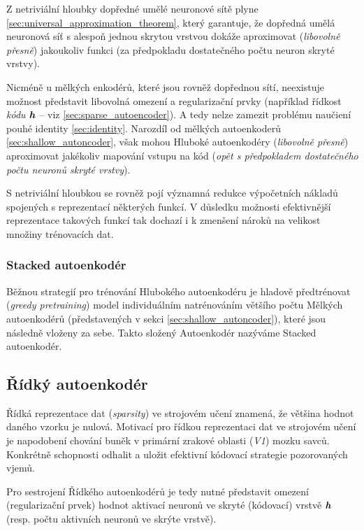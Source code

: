 Z netriviální hloubky dopředné umělé neuronové sítě plyne \autoref{sec:universal_approximation_theorem},
který garantuje, že dopředná umělá neuronová síť s alespoň jednou skrytou vrstvou dokáže aproximovat (\emph{libovolně přesně}) jakoukoliv funkci (za předpokladu dostatečného počtu neuron skryté vrstvy).

Nicméně u mělkých enkodérů, které jsou rovněž dopřednou sítí, neexistuje možnost představit libovolná omezení a regularizační prvky (například řídkost \emph{kódu} $\textbf{\emph{h}}$ – viz \autoref{sec:sparse_autoencoder}).
A tedy nelze zamezit problému naučiení pouhé identity \autoref{sec:identity}. Narozdíl od mělkých autoenkoderů \autoref{sec:shallow_autoncoder},
však mohou Hluboké autoenkodéry (\emph{libovolně přesně}) aproximovat jakékoliv mapování vstupu na kód (\emph{opět s předpokladem dostatečného počtu neuronů skryté vrstvy}).

S netriviální hloubkou se rovněž pojí významná redukce výpočetních nákladů spojených s reprezentací některých funkcí. 
V důsledku možnosti efektivnější reprezentace takových funkcí tak dochazí i k zmenšení nároků na velikost množiny trénovacích dat.


\subsubsection{Stacked autoenkodér}
Běžnou strategií pro trénování Hlubokého autoenkodéru je hladově předtrénovat (\emph{greedy pretraining}) model individuálním natrénováním většího počtu Mělkých autoenkodérů (představených v sekci \autoref{sec:shallow_autoncoder}), které jsou následně vloženy za sebe.
Takto složený Autoenkodér nazýváme Stacked autoenkodér.



\subsection{Řídký autoenkodér}
\label{sec:sparse_autoencoder}
Řídká reprezentace dat (\emph{sparsity}) ve strojovém učení znamená, že většina hodnot daného vzorku je nulová. 
Motivací pro řídkou reprezentaci dat ve strojovém učení je napodobení chování buněk v primární zrakové oblasti (\emph{V1}) mozku savců.
Konkrétně schopnosti odhalit a uložit efektivní kódovací strategie pozorovaných vjemů. 

Pro sestrojení Řídkého autoenkodérů je tedy nutné představit omezení (regularizační prvek) hodnot aktivací neuronů ve skryté (kódovací) vrstvě $\textbf{\emph{h}}$ (resp. počtu aktivních neuronů ve skrýte vrstvě).

